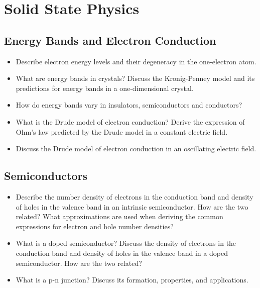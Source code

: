 



\tableofcontents

\section{Solid State Physics}

\subsection{Energy Bands and Electron Conduction}
\begin{itemize}
	\item Describe electron energy levels and their degeneracy in the one-electron atom.
	
	\item What are energy bands in crystals?
    Discuss the Kronig-Penney model and its predictions for energy bands in a one-dimensional crystal.
		
	\item How do energy bands vary in insulators, semiconductors and conductors?

	\item What is the Drude model of electron conduction? 
    Derive the expression of Ohm's law predicted by the Drude model in a constant electric field.
	
	\item Discuss the Drude model of electron conduction in an oscillating electric field.
\end{itemize}

\subsection{Semiconductors}
\begin{itemize}
	\item Describe the number density of electrons in the conduction band and density of holes in the valence band in an intrinsic semiconductor.
    How are the two related?
    What approximations are used when deriving the common expressions for electron and hole number densities?
	
	\item What is a doped semiconductor?
    Discuss the density of electrons in the conduction band and density of holes in the valence band in a doped semiconductor.
    How are the two related?
	
	\item What is a p-n junction?
    Discuss its formation, properties, and applications.
	
\end{itemize}


